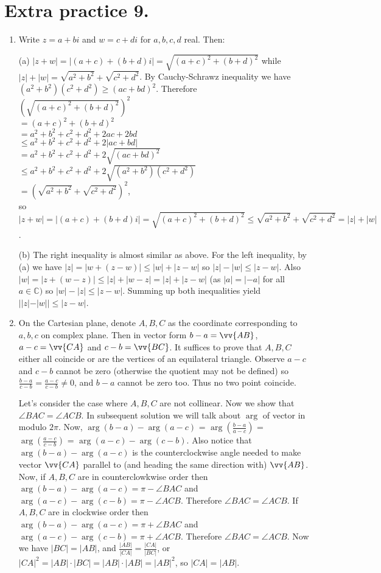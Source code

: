 \documentclass[11pt]{article}
\begin{document}
\section {Extra practice 9.}
\begin{enumerate}
\item Write $z=a+bi$ and $w=c+di$ for $a,b,c,d$ real. Then:

(a) $|z+w|=|(a+c)+(b+d)i|=\sqrt{(a+c)^2+(b+d)^2}$ while $|z|+|w|=\sqrt{a^2+b^2}+\sqrt{c^2+d^2}$. By Cauchy-Schrawz inequality we have $(a^2+b^2)(c^2+d^2)\ge (ac+bd)^2$. Therefore\\ 
$(\sqrt{(a+c)^2+(b+d)^2})^2$\\
$=(a+c)^2+(b+d)^2$\\
$=a^2+b^2+c^2+d^2+2ac+2bd$\\
$\le a^2+b^2+c^2+d^2+2|ac+bd|$\\
$= a^2+b^2+c^2+d^2+2\sqrt{(ac+bd)^2}$\\
$\le a^2+b^2+c^2+d^2+2\sqrt{(a^2+b^2)(c^2+d^2)}$\\
$=(\sqrt{a^2+b^2}+\sqrt{c^2+d^2})^2$,\\
so $|z+w|=|(a+c)+(b+d)i|=\sqrt{(a+c)^2+(b+d)^2}\le \sqrt{a^2+b^2}+\sqrt{c^2+d^2}=|z|+|w|$.

(b) The right inequality is almost similar as above. For the left inequality, by (a) we have $|z|=|w+(z-w)|\le |w|+|z-w|$ so $|z|-|w|\le |z-w|$. Also $|w|=|z+(w-z)|\le |z|+|w-z|=|z|+|z-w|$ (as $|a|=|-a|$ for all $a\in\mathbb{C})$ so $|w|-|z|\le |z-w|$. Summing up both inequalities yield $||z|-|w||\le |z-w|$.

\item On the Cartesian plane, denote $A, B, C$ as the coordinate corresponding to $a,b,c$ on complex plane. Then in vector form $b-a=\vv{AB}$, $a-c=\vv{CA}$ and $c-b=\vv{BC}$. It suffices to prove that $A, B, C$ either all coincide or are the vertices of an equilateral triangle. Observe $a-c$ and $c-b$ cannot be zero (otherwise the quotient may not be defined) so $\frac{b-a}{c-b}=\frac{a-c}{c-b}\neq 0$, and $b-a$ cannot be zero too. Thus no two point coincide.

Let's consider the case where $A,B,C$ are not collinear. Now we show that $\angle BAC=\angle ACB$. In subsequent solution we will talk about $\arg$ of vector in modulo $2\pi$. Now, $\arg (b-a)-\arg (a-c)$ = $\arg (\frac{b-a}{a-c})$ = $\arg (\frac{a-c}{c-b})$ = $\arg (a-c)-\arg (c-b)$. Also notice that $\arg (b-a)-\arg (a-c)$ is the counterclockwise angle needed to make vector $\vv{CA}$ parallel to (and heading the same direction with) $\vv{AB}$. Now, if $A,B,C$ are in counterclowkwise order then $\arg (b-a)-\arg (a-c)= \pi-\angle BAC$ and $\arg (a-c)-\arg (c-b)=\pi-\angle ACB$. Therefore $\angle BAC=\angle ACB$. If $A,B,C$ are in clockwise order then $\arg (b-a)-\arg (a-c)= \pi+\angle BAC$ and $\arg (a-c)-\arg (c-b)=\pi+\angle ACB$. Therefore $\angle BAC=\angle ACB$. Now we have $|BC|=|AB|$, and $\frac{|AB|}{|CA|}=\frac{|CA|}{|BC|}$, or $|CA|^2=|AB|\cdot |BC|=|AB|\cdot |AB|=|AB|^2$, so $|CA|=|AB|$. 


\end{enumerate}
\end{document}

